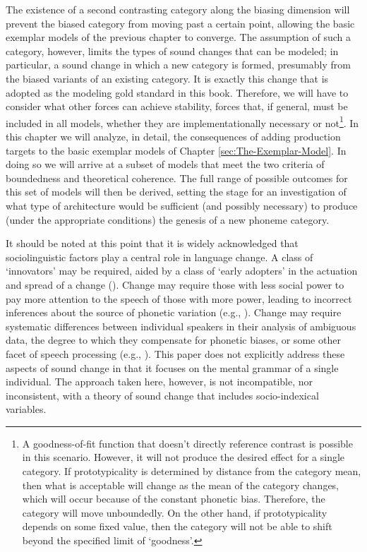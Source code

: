 The existence of a second contrasting category along the biasing dimension
will prevent the biased category from moving past a certain point,
allowing the basic exemplar models of the previous chapter to converge.
The assumption of such a category, however, limits the types of sound
changes that can be modeled; in particular, a sound change in which
a new category is formed, presumably from the biased variants of an
existing category. It is exactly this change that is adopted as the
modeling gold standard in this book. Therefore, we will have to consider
what other forces can achieve stability, forces that, if general,
must be included in all models, whether they are implementationally
necessary or not\footnote{A goodness-of-fit function that doesn't directly reference contrast
is possible in this scenario. However, it will not produce the desired
effect for a single category. If prototypicality is determined by
distance from the category mean, then what is acceptable will change
as the mean of the category changes, which will occur because of the
constant phonetic bias. Therefore, the category will move unboundedly.
On the other hand, if prototypicality depends on some fixed value,
then the category will not be able to shift beyond the specified limit
of `goodness'. }. In this chapter we will analyze, in detail, the consequences of
adding production targets to the basic exemplar models of Chapter
\ref{sec:The-Exemplar-Model}. In doing so we will arrive at a subset
of models that meet the two criteria of boundedness and theoretical
coherence. The full range of possible outcomes for this set of models
will then be derived, setting the stage for an investigation of what
type of architecture would be sufficient (and possibly necessary)
to produce (under the appropriate conditions) the genesis of a new
phoneme category.

It should be noted at this point that it is widely acknowledged that
sociolinguistic factors play a central role in language change. A
class of `innovators' may be required, aided by a class of `early
adopters' in the actuation and spread of a change (\citealt{milroy1985linguistic}).
Change may require those with less social power to pay more attention
to the speech of those with more power, leading to incorrect inferences
about the source of phonetic variation (e.g., \citealt{Garrett2013}).
Change may require systematic differences between individual speakers
in their analysis of ambiguous data, the degree to which they compensate
for phonetic biases, or some other facet of speech processing (e.g.,
\citealp{Beddor2009,yu2013socio}). This paper does not explicitly
address these aspects of sound change in that it focuses on the mental
grammar of a single individual. The approach taken here, however,
is not incompatible, nor inconsistent, with a theory of sound change
that includes socio-indexical variables.

